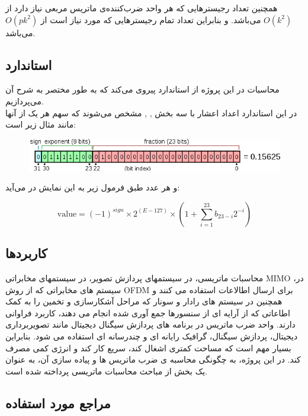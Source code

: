 \documentclass[12pt,onecolumn,a4paper,fleqn]{article}
\begin{document}
همچنین تعداد رجیستر‌هایی که هر واحد ضرب‌کننده‌ی ماتریس مربعی نیاز دارد از $O(k^2)$ می‌باشد. و بنابراین تعداد تمام رجیستر‌هایی که مورد نیاز است از $O(pk^2)$ می‌باشد.

\subsection{استاندارد‌ }
محاسبات در این پروژه از استاندارد
 پیروی می‌کند که به طور مختصر به شرح آن می‌پردازیم. \\
 در این استاندارد اعداد اعشار با سه بخش  ,  ,  مشخص می‌شوند که سهم هر یک از آنها مانند مثال زیر است:
 
\begin{figure}[h]
	\centering
	\includegraphics[width=0.8\linewidth]{source/float_example.png}
\end{figure}

و هر عدد طبق فرمول زیر به این نمایش در می‌آید:

\begin{equation}
\text{value} = (-1)^{sign} \times 2^{(E-127)} \times (1 + \sum_{i=1}^{23}b_{23-i}2^{-i})
\end{equation}
\pagebreak
\subsection{کاربرد‌ها}
 
 محاسبات ماتریسی، در سیستمهای پردازش تصویر، در سیستمهای مخابراتی MIMO ،در سیستم های مخابراتی که از روش OFDM برای ارسال اطالاعات استفاده می کنند و همچنین در سیستم های رادار و سونار که مراحل آشکارسازی و تخمین را به کمک اطاعاتی که از آرایه ای از سنسورها جمع آوری شده انجام می دهند، کاربرد فراوانی دارند. 
 واحد ضرب ماتریس در برنامه های پردازش سیگنال دیجیتال مانند تصویربرداری دیجیتال، پردازش سیگنال، گرافیک رایانه ای و چندرسانه ای استفاده می شود. بنابراین بسیار مهم است که مساحت کمتری اشغال کند، سریع کار کند و انرژی کمی مصرف کند. 
 در این پروژه، به چگونگی محاسبه ی ضرب ماتریس ها و پیاده سازی آن، به عنوان یک بخش از مباحث محاسبات ماتریسی پرداخته شده است.

\subsection{مراجع مورد استفاده}
\end{document}
